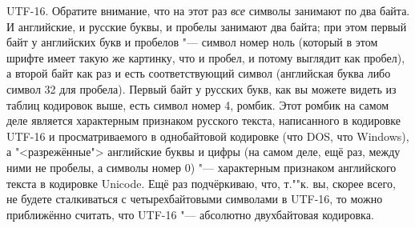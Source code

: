 \begin{ulist}
\item UTF-16. Обратите внимание, что на этот раз \textit{все} символы занимают по два байта. И 
английские, и русские буквы, и пробелы занимают два байта; при этом первый байт у английских букв и 
пробелов "--- символ номер ноль (который в этом шрифте имеет такую же картинку, что и пробел, и 
потому выглядит как пробел), а второй байт как раз и есть соответствующий символ (английская буква 
либо символ 32 для пробела). Первый байт у русских букв, как вы можете видеть из таблиц кодировок 
выше, есть символ номер 4, ромбик. Этот ромбик на самом деле является характерным признаком 
русского текста, написанного в кодировке UTF-16 и просматриваемого в однобайтовой кодировке (что 
DOS, что Windows), а "<разрежённые"> английские буквы и цифры (на самом деле, ещё раз, между ними 
не пробелы, а символы номер 0) "--- характерным признаком английского текста в кодировке Unicode. 
Ещё раз подчёркиваю, что, т.""к. вы, скорее всего, не будете сталкиваться с четырехбайтовыми 
символами в UTF-16, то можно приближённо считать, что UTF-16 "--- абсолютно двухбайтовая кодировка.
\end{ulist}


